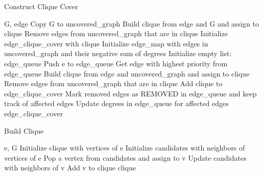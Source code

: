 \begin{algorithm}
\caption{Construct Clique Cover}
\begin{algorithmic}[1]
\REQUIRE G, edge
\STATE Copy G to uncovered\_graph
\STATE Build clique from edge and G and assign to clique
\STATE Remove edges from uncovered\_graph that are in clique
\STATE Initialize edge\_clique\_cover with clique
\STATE Initialize edge\_map with edges in uncovered\_graph and their negative sum of degrees
\STATE Initialize empty list: edge\_queue
    \STATE Push e to edge\_queue
\ENDWHILE
{}
    \STATE Get edge with highest priority from edge\_queue
    \STATE Build clique from edge and uncovered\_graph and assign to clique
    \STATE Remove edges from uncovered\_graph that are in clique
    \STATE Add clique to edge\_clique\_cover
    \STATE Mark removed edges as REMOVED in edge\_queue and keep track of affected edges
    \STATE Update degrees in edge\_queue for affected edges
\ENDWHILE
\RETURN edge\_clique\_cover
\end{algorithmic}
\end{algorithm}

\begin{algorithm}
\caption{Build Clique}
\begin{algorithmic}[1]
\REQUIRE e, G
\STATE Initialize clique with vertices of e
\STATE Initialize candidates with neighbors of vertices of e
    \STATE Pop a vertex from candidates and assign to v
        \STATE Update candidates with neighbors of v
        \STATE Add v to clique
    \ENDIF
\ENDWHILE
\RETURN clique
\end{algorithmic}
\end{algorithm}


